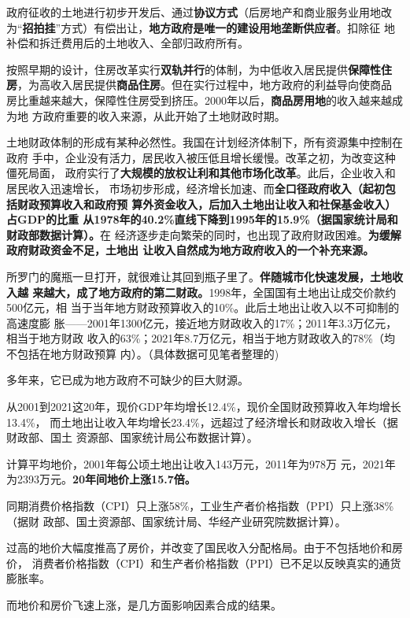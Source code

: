 政府征收的土地进行初步开发后、通过\textbf{协议方式}（后房地产和商业服务业用地改
为“\textbf{招拍挂}”方式）有偿出让，\textbf{地方政府是唯一的建设用地垄断供应者}。扣除征
地补偿和拆迁费用后的土地收入、全部归政府所有。

按照早期的设计，住房改革实行\textbf{双轨并行}的体制，为中低收入居民提供\textbf{保障性住
  房}，为高收入居民提供\textbf{商品住房}。但在实行过程中，地方政府的利益导向使商品
房比重越来越大，保障性住房受到挤压。2000年以后，\textbf{商品房用地}的收入越来越成为地
方政府重要的收入来源，从此开始了土地财政时期。

土地财政体制的形成有某种必然性。我国在计划经济体制下，所有资源集中控制在政府
手中，企业没有活力，居民收入被压低且增长缓慢。改革之初，为改变这种僵死局面，
政府实行了\textbf{大规模的放权让利和其他市场化改革}。此后，企业收入和居民收入迅速增长，
市场初步形成，经济增长加速、而\textbf{全口径政府收入（起初包括财政预算收入和政府预
  算外资金收入，后加入土地出让收入和社保基金收入）占GDP的比重
  从1978年的40.2\%直线下降到1995年的15.9\%（据国家统计局和财政部数据计算）。}在
经济逐步走向繁荣的同时，也出现了政府财政困难。\textbf{为缓解政府财政资金不足，土地出
让收入自然成为地方政府收入的一个补充来源。}

所罗门的魔瓶一旦打开，就很难让其回到瓶子里了。\textbf{伴随城市化快速发展，土地收入越
来越大，成了地方政府的第二财政。}1998年，全国国有土地出让成交价款约500亿元，相
当于当年地方财政预算收入的10\%。此后土地出让收入以不可抑制的高速度膨
胀——2001年1300亿元，接近地方财政收入的17\%；2011年3.3万亿元，相当于地方财政
收入的63\%；2021年8.7万亿元，相当于地方财政收入的78\%（均不包括在地方财政预算
内）。（具体数据可见笔者整理的)

多年来，它已成为地方政府不可缺少的巨大财源。

从2001到2021这20年，现价GDP年均增长12.4\%，现价全国财政预算收入年均增长13.4\%，
而土地出让收入年均增长23.4\%，远超过了经济增长和财政收入增长（据财政部、国土
资源部、国家统计局公布数据计算）。

计算平均地价，2001年每公顷土地出让收入143万元，2011年为978万
元，2021年为2393万元。\textbf{20年间地价上涨15.7倍。}

同期消费价格指数（CPI）只上涨58\%，工业生产者价格指数（PPI）只上涨38\%（据财
政部、国土资源部、国家统计局、华经产业研究院数据计算）。

过高的地价大幅度推高了房价，并改变了国民收入分配格局。由于不包括地价和房价，
消费者价格指数（CPI）和生产者价格指数（PPI）已不足以反映真实的通货膨胀率。

而地价和房价飞速上涨，是几方面影响因素合成的结果。

